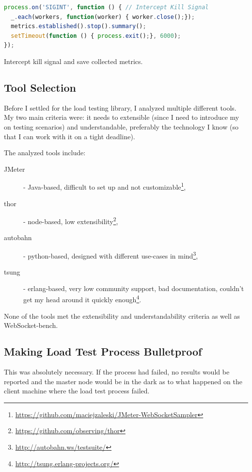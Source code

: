 \documentclass{uvamscse}
\begin{document}
\begin{sourcecode}[H]
\begin{lstlisting}[language=javascript]
process.on('SIGINT', function () { // Intercept Kill Signal
  _.each(workers, function(worker) { worker.close();});
  metrics.established().stop().summary();
  setTimeout(function () { process.exit();}, 6000);
});

\end{lstlisting}
\caption{Intercept kill signal and save collected metrics.}
\label{lstlisting:loadtestexec4}
\end{sourcecode}


\subsection{Tool Selection}

Before I settled for the load testing library, I analyzed multiple different tools. My two main criteria were: it needs to extensible (since I need to introduce my on testing scenarios) and understandable, preferably the technology I know (so that I can work with it on a tight deadline).

The analyzed tools include:
\begin{description}
  \item [JMeter]- Java-based, difficult to set up and not customizable\footnote{\url{https://github.com/maciejzaleski/JMeter-WebSocketSampler}},
  \item [thor]- node-based, low extensibility\footnote{\url{https://github.com/observing/thor}},
  \item [autobahn]- python-based, designed with different use-cases in mind\footnote{\url{http://autobahn.ws/testsuite/}},
  \item [tsung]- erlang-based, very low community support, bad documentation, couldn't get my head around it quickly enough\footnote{\url{http://tsung.erlang-projects.org/}}.
\end{description}

None of the tools met the extensibility and understandability criteria as well as WebSocket-bench.

\subsection{Making Load Test Process Bulletproof}
This was absolutely necessary. If the process had failed, no results would be reported and the master node would be in the dark as to what happened on the client machine where the load test process failed.
\end{document}
